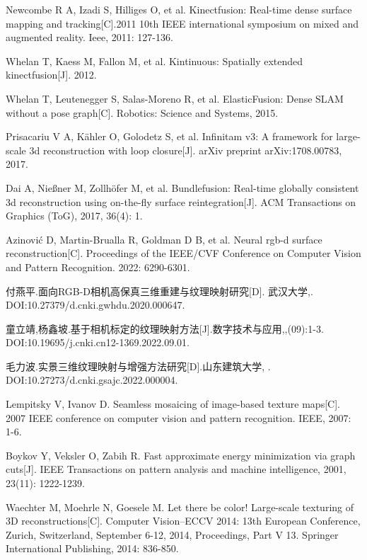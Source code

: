 

 Newcombe R A, Izadi S, Hilliges O, et al. Kinectfusion: Real-time dense surface mapping and tracking[C].2011 10th IEEE international symposium on mixed and augmented reality. Ieee, 2011: 127-136.

Whelan T, Kaess M, Fallon M, et al. Kintinuous: Spatially extended kinectfusion[J]. 2012.

Whelan T, Leutenegger S, Salas-Moreno R, et al. ElasticFusion: Dense SLAM without a pose graph[C]. Robotics: Science and Systems, 2015.


 Prisacariu V A, Kähler O, Golodetz S, et al. Infinitam v3: A framework for large-scale 3d reconstruction with loop closure[J]. arXiv preprint arXiv:1708.00783, 2017.

Dai A, Nießner M, Zollhöfer M, et al. Bundlefusion: Real-time globally consistent 3d reconstruction using on-the-fly surface reintegration[J]. ACM Transactions on Graphics (ToG), 2017, 36(4): 1.

 Azinović D, Martin-Brualla R, Goldman D B, et al. Neural rgb-d surface reconstruction[C]. Proceedings of the IEEE/CVF Conference on Computer Vision and Pattern Recognition. 2022: 6290-6301.

付燕平.\enspace 面向RGB-D相机高保真三维重建与纹理映射研究[D]. \enspace 武汉大学,. DOI:10.27379/d.cnki.gwhdu.2020.000647.
 
童立靖,\enspace 杨鑫坡.\enspace 基于相机标定的纹理映射方法[J].数字技术与应用,,(09):1-3. DOI:10.19695/j.cnki.cn12-1369.2022.09.01.

毛力波.\enspace 实景三维纹理映射与增强方法研究[D].\enspace 山东建筑大学, . \enspace DOI:10.27273/d.cnki.gsajc.2022.000004.

Lempitsky V, Ivanov D. Seamless mosaicing of image-based texture maps[C]. 2007 IEEE conference on computer vision and pattern recognition. IEEE, 2007: 1-6.


Boykov Y, Veksler O, Zabih R. Fast approximate energy minimization via graph cuts[J]. IEEE Transactions on pattern analysis and machine intelligence, 2001, 23(11): 1222-1239.

Waechter M, Moehrle N, Goesele M. Let there be color! Large-scale texturing of 3D reconstructions[C]. Computer Vision–ECCV 2014: 13th European Conference, Zurich, Switzerland, September 6-12, 2014, Proceedings, Part V 13. Springer International Publishing, 2014: 836-850.


